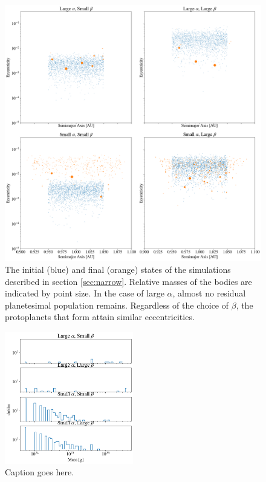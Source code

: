 \documentclass[twocolumn]{aastex63}
\begin{document}


\begin{figure}
\begin{center}
    \includegraphics[width=\textwidth]{figures/alpha_beta.png}
    \caption{The initial (blue) and final (orange) states of the simulations described in section \ref{sec:narrow}. Relative masses of the bodies are indicated by point size. In the case of large $\alpha$, almost no residual planetesimal population remains. Regardless of the choice of $\beta$, the protoplanets that form attain similar eccentricities. \label{fig:alpha_beta}}
\end{center}
\end{figure}

\begin{figure}
\begin{center}
    \includegraphics[width=0.5\textwidth]{figures/alpha_beta_mass.png}
    \caption{Caption goes here.\label{fig:alpha_beta_mass}}
\end{center}
\end{figure}
\end{document}
